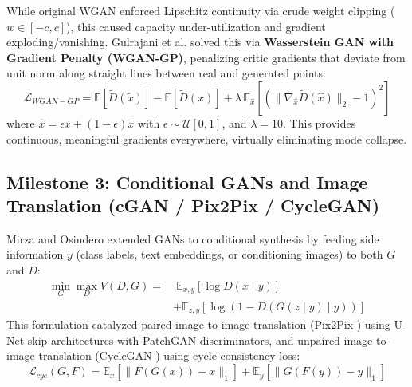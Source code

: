 \documentclass[conference]{IEEEtran}
\begin{document}
While original WGAN enforced Lipschitz continuity via crude weight clipping ($w \in [-c, c]$), this caused capacity under-utilization and gradient exploding/vanishing. Gulrajani et al. \cite{gulrajani2017improved} solved this via \textbf{Wasserstein GAN with Gradient Penalty (WGAN-GP)}, penalizing critic gradients that deviate from unit norm along straight lines between real and generated points:
\begin{equation}
\mathcal{L}_{WGAN-GP} = \mathbb{E}[\tilde{D}(\tilde{x})] - \mathbb{E}[\tilde{D}(x)] + \lambda \, \mathbb{E}_{\hat{x}}\left[ \left( \|\nabla_{\hat{x}} \tilde{D}(\hat{x})\|_2 - 1 \right)^2 \right]
\end{equation}
where $\hat{x} = \epsilon x + (1 - \epsilon)\tilde{x}$ with $\epsilon \sim \mathcal{U}[0, 1]$, and $\lambda = 10$. This provides continuous, meaningful gradients everywhere, virtually eliminating mode collapse.

\subsection{Milestone 3: Conditional GANs and Image Translation (cGAN / Pix2Pix / CycleGAN)}
Mirza and Osindero \cite{mirza2014conditional} extended GANs to conditional synthesis by feeding side information $y$ (class labels, text embeddings, or conditioning images) to both $G$ and $D$:
\begin{align}
\min_G \max_D V(D, G) = &\;\mathbb{E}_{x, y} [\log D(x \mid y)] \nonumber \\
&+ \mathbb{E}_{z, y} [\log (1 - D(G(z \mid y) \mid y))]
\end{align}
This formulation catalyzed paired image-to-image translation (Pix2Pix \cite{isola2017image}) using U-Net skip architectures with PatchGAN discriminators, and unpaired image-to-image translation (CycleGAN \cite{zhu2017unpaired}) using cycle-consistency loss:
\begin{equation}
\mathcal{L}_{cyc}(G, F) = \mathbb{E}_x[\|F(G(x)) - x\|_1] + \mathbb{E}_y[\|G(F(y)) - y\|_1]
\end{equation}
\end{document}
